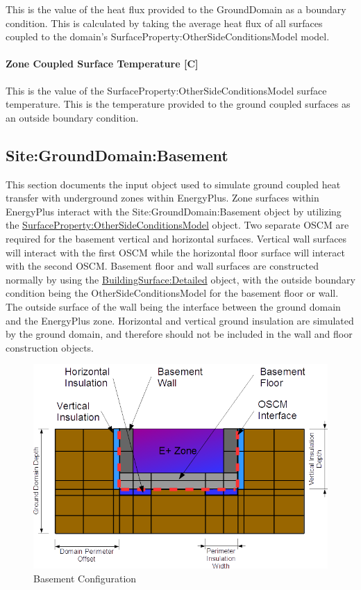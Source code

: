 This is the value of the heat flux provided to the GroundDomain as a boundary condition. This is calculated by taking the average heat flux of all surfaces coupled to the domain's SurfaceProperty:OtherSideConditionsModel model.

\paragraph{Zone Coupled Surface Temperature {[}C{]}}\label{zone-coupled-surface-temperature-c}

This is the value of the SurfaceProperty:OtherSideConditionsModel surface temperature. This is the temperature provided to the ground coupled surfaces as an outside boundary condition.

\subsection{Site:GroundDomain:Basement}\label{sitegrounddomainbasement}

This section documents the input object used to simulate ground coupled heat transfer with underground zones within EnergyPlus. Zone surfaces within EnergyPlus interact with the Site:GroundDomain:Basement object by utilizing the \hyperref[surfacepropertyothersideconditionsmodel]{SurfaceProperty:OtherSideConditionsModel} object. Two separate OSCM are required for the basement vertical and horizontal surfaces. Vertical wall surfaces will interact with the first OSCM while the horizontal floor surface will interact with the second OSCM. Basement floor and wall surfaces are constructed normally by using the \hyperref[buildingsurfacedetailed]{BuildingSurface:Detailed} object, with the outside boundary condition being the OtherSideConditionsModel for the basement floor or wall. The outside surface of the wall being the interface between the ground domain and the EnergyPlus zone. Horizontal and vertical ground insulation are simulated by the ground domain, and therefore should not be included in the wall and floor construction objects.

\begin{figure}[htbp]
\centering
\includegraphics{media/image900.png}
\caption{Basement Configuration \protect \label{fig:basement-configuration}}
\end{figure}

